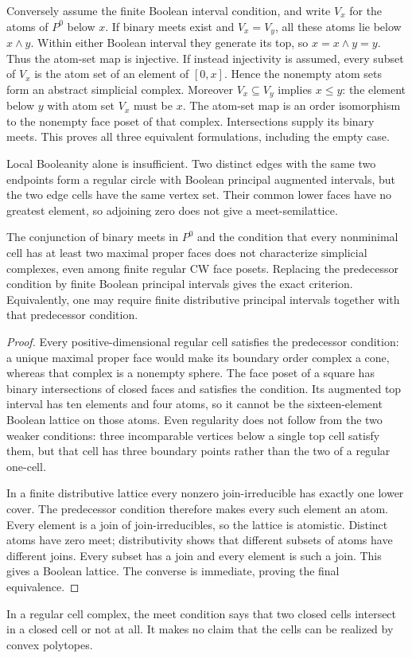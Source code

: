 Conversely assume the finite Boolean interval condition, and
write $V_x$ for the atoms of $P^0$ below $x$. If binary meets exist
and $V_x=V_y$, all these atoms lie below $x\wedge y$.
Within either Boolean interval they generate its top, so
$x=x\wedge y=y$. Thus the atom-set map is injective.
If instead injectivity is assumed, every subset of $V_x$ is
the atom set of an element of $[0,x]$. Hence the nonempty atom
sets form an abstract simplicial complex. Moreover
$V_x\subseteq V_y$ implies $x\le y$: the element below $y$
with atom set $V_x$ must be $x$. The atom-set map is an order
isomorphism to the nonempty face poset of that complex.
Intersections supply its binary meets. This proves all three
equivalent formulations, including the empty case.

Local Booleanity alone is insufficient. Two distinct edges with
the same two endpoints form a regular circle with Boolean
principal augmented intervals, but the two edge cells have the
same vertex set. Their common lower faces have no greatest
element, so adjoining zero does not give a meet-semilattice.

\begin{proposition}\label{prop:predecessor-repair}
The conjunction of binary meets in $P^0$ and the condition that
every nonminimal cell has at least two maximal proper faces does
not characterize simplicial complexes, even among finite regular
CW face posets. Replacing the predecessor condition by finite
Boolean principal intervals gives the exact criterion.
Equivalently, one may require finite distributive principal
intervals together with that predecessor condition.
\end{proposition}
\begin{proof}
Every positive-dimensional regular cell satisfies the predecessor
condition: a unique maximal proper face would make its boundary
order complex a cone, whereas that complex is a nonempty sphere.
The face poset of a square has binary intersections of closed
faces and satisfies the condition. Its augmented top interval
has ten elements and four atoms, so it cannot be the sixteen-element
Boolean lattice on those atoms. Even regularity does not follow
from the two weaker conditions: three incomparable vertices below
a single top cell satisfy them, but that cell has three boundary
points rather than the two of a regular one-cell.

In a finite distributive lattice every nonzero join-irreducible
has exactly one lower cover. The predecessor condition therefore
makes every such element an atom. Every element is a join of
join-irreducibles, so the lattice is atomistic. Distinct atoms have
zero meet; distributivity shows that different subsets of atoms
have different joins. Every subset has a join and every element
is such a join. This gives a Boolean lattice. The converse is
immediate, proving the final equivalence.
\end{proof}
In a regular cell complex, the meet condition says that two closed
cells intersect in a closed cell or not at all. It makes no claim
that the cells can be realized by convex polytopes.

